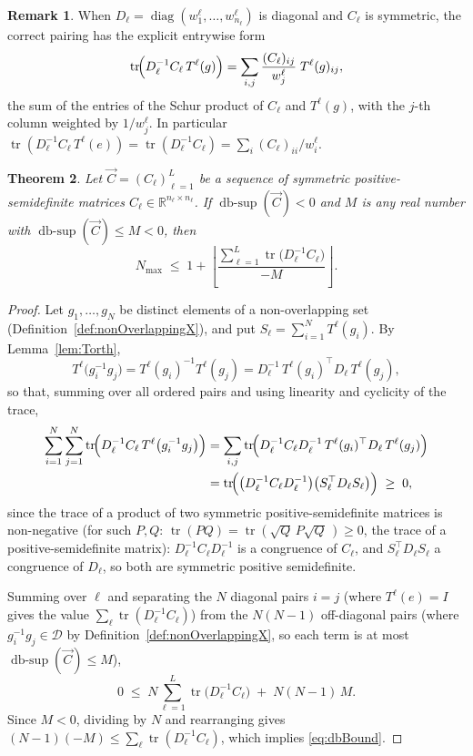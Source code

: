 \documentclass[reqno]{amsart}
\newtheorem{theorem}{Theorem}[section]
\theoremstyle{definition}
\newtheorem{remark}[theorem]{Remark}
\DeclareMathOperator{\tr}{tr}
\DeclareMathOperator{\diag}{diag}
\DeclareMathOperator{\dbsup}{db\text{-}sup}
\newcommand{\R}{\mathbb{R}}
\newcommand{\Dom}{\mathcal{D}}
\begin{document}
\begin{remark}\label{rem:entrywise}
When $D_\ell=\diag(w^\ell_1,\dots,w^\ell_{n_\ell})$ is
diagonal and $C_\ell$ is symmetric, the correct pairing has the explicit entrywise form
\[
\tr\!\Bigl(D_\ell^{-1}C_\ell\,T^\ell(g)\Bigr)
=\sum_{i,j}\frac{(C_\ell)_{ij}}{w^\ell_j}\;T^\ell(g)_{ij},
\]
the sum of the entries of the Schur product of $C_\ell$ and $T^\ell(g)$, with the $j$-th column
weighted by $1/w^\ell_j$. In particular
$\tr(D_\ell^{-1}C_\ell\,T^\ell(e))=\tr(D_\ell^{-1}C_\ell)=\sum_i (C_\ell)_{ii}/w^\ell_i$.
\end{remark}

\begin{theorem}\label{thm:dbBound}
Let $\overrightarrow C=(C_\ell)_{\ell=1}^{L}$ be a sequence of symmetric positive-semidefinite
matrices $C_\ell\in\R^{n_\ell\times n_\ell}$. If $\dbsup(\overrightarrow C)<0$ and $M$ is any real
number with $\dbsup(\overrightarrow C)\le M<0$, then
\begin{equation}\label{eq:dbBound}
N_{\max}\;\le\;1+\left\lfloor
\frac{\sum_{\ell=1}^{L}\tr\bigl(D_\ell^{-1}C_\ell\bigr)}{-M}\right\rfloor .
\end{equation}
\end{theorem}
\begin{proof}
Let $g_1,\dots,g_N$ be distinct elements of a non-overlapping set
(Definition~\ref{def:nonOverlappingX}), and put $S_\ell=\sum_{i=1}^{N}T^\ell(g_i)$. By
Lemma~\ref{lem:Torth},
\[
T^\ell\bigl(g_i^{-1}g_j\bigr)=T^\ell(g_i)^{-1}T^\ell(g_j)
=D_\ell^{-1}\,T^\ell(g_i)^\top D_\ell\,T^\ell(g_j),
\]
so that, summing over all ordered pairs and using linearity and cyclicity of the trace,
\begin{align*}
\sum_{i=1}^{N}\sum_{j=1}^{N}\tr\!\Bigl(D_\ell^{-1}C_\ell\,T^\ell\bigl(g_i^{-1}g_j\bigr)\Bigr)
&=\sum_{i,j}\tr\!\Bigl(D_\ell^{-1}C_\ell D_\ell^{-1}\,T^\ell(g_i)^\top D_\ell\,T^\ell(g_j)\Bigr)\\
&=\tr\!\Bigl(\bigl(D_\ell^{-1}C_\ell D_\ell^{-1}\bigr)\bigl(S_\ell^\top D_\ell S_\ell\bigr)\Bigr)
\;\ge\;0,
\end{align*}
since the trace of a product of two symmetric positive-semidefinite matrices is non-negative
(for such $P,Q$: $\tr(PQ)=\tr(\sqrt Q\,P\sqrt Q\,)\ge0$, the trace of a positive-semidefinite
matrix): $D_\ell^{-1}C_\ell D_\ell^{-1}$ is a congruence of $C_\ell$, and
$S_\ell^\top D_\ell S_\ell$ a congruence of $D_\ell$, so both are symmetric positive semidefinite.

Summing over $\ell$ and separating the $N$ diagonal pairs $i=j$ (where
$T^\ell(e)=I$ gives the value $\sum_\ell\tr(D_\ell^{-1}C_\ell)$) from the $N(N-1)$ off-diagonal
pairs (where $g_i^{-1}g_j\in\Dom$ by Definition~\ref{def:nonOverlappingX}, so each term is at most
$\dbsup(\overrightarrow C)\le M$),
\[
0\;\le\;N\sum_{\ell=1}^{L}\tr\bigl(D_\ell^{-1}C_\ell\bigr)\;+\;N(N-1)\,M .
\]
Since $M<0$, dividing by $N$ and rearranging gives
$(N-1)(-M)\le\sum_\ell\tr(D_\ell^{-1}C_\ell)$, which implies \eqref{eq:dbBound}.
\end{proof}
\end{document}
